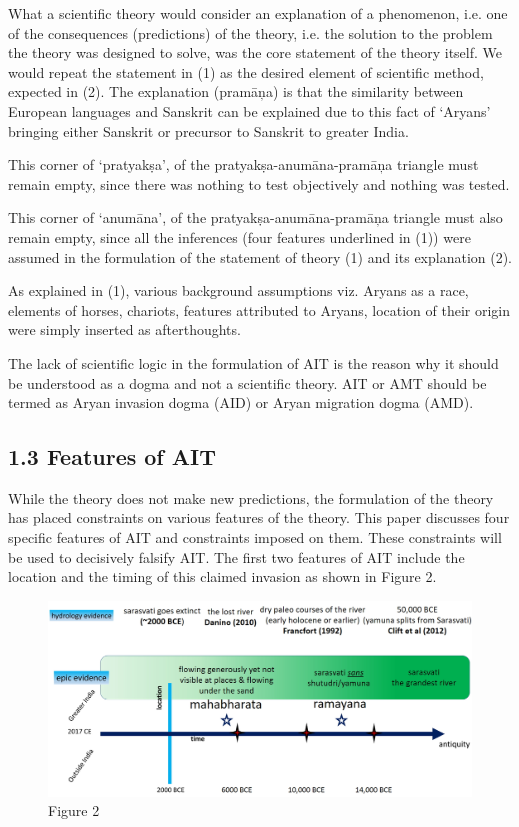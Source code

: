  \item What a scientific theory would consider an explanation of a phenomenon, i.e. one of the consequences (predictions) of the theory, i.e. the solution to the problem the theory was designed to solve, was the core statement of the theory itself. We would repeat the statement in (1) as the desired element of scientific method, expected in (2). The explanation (pramāņa) is that the similarity between European languages and Sanskrit can be explained due to this fact of ‘Aryans’ bringing either Sanskrit or precursor to Sanskrit to greater India.

 \item This corner of ‘pratyakṣa’, of the pratyakṣa-anumāna-pramāņa triangle must remain empty, since there was nothing to test objectively and nothing was tested.

 \item This corner of ‘anumāna’, of the pratyakṣa-anumāna-pramāņa triangle must also remain empty, since all the inferences (four features underlined in (1)) were assumed in the formulation of the statement of theory (1) and its explanation (2).

 \item As explained in (1), various background assumptions viz. Aryans as a race, elements of horses, chariots, features attributed to Aryans, location of their origin were simply inserted as afterthoughts.

The lack of scientific logic in the formulation of AIT is the reason why it should be understood as a dogma and not a scientific theory. AIT or AMT should be termed as Aryan invasion dogma (AID) or Aryan migration dogma (AMD).


\subsection{1.3 Features of AIT}

While the theory does not make new predictions, the formulation of the theory has placed constraints on various features of the theory. This paper discusses four specific features of AIT and constraints imposed on them. These constraints will be used to decisively falsify AIT. The first two features of AIT include the location and the timing of this claimed invasion as shown in Figure 2.

\begin{figure}
\includegraphics{"images/8-02.jpg"}
\caption{Figure 2}
\end{figure}

